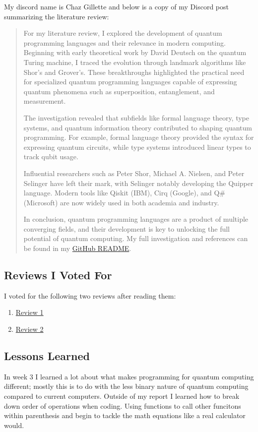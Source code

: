 \documentclass{article}
\begin{document}
My discord name is Chaz Gillette and below is a copy of my Discord post summarizing the literature review:

\begin{quote}
For my literature review, I explored the development of quantum programming languages and their relevance in modern computing. Beginning with early theoretical work by David Deutsch on the quantum Turing machine, I traced the evolution through landmark algorithms like Shor's and Grover's. These breakthroughs highlighted the practical need for specialized quantum programming languages capable of expressing quantum phenomena such as superposition, entanglement, and measurement.

The investigation revealed that subfields like formal language theory, type systems, and quantum information theory contributed to shaping quantum programming. For example, formal language theory provided the syntax for expressing quantum circuits, while type systems introduced linear types to track qubit usage.

Influential researchers such as Peter Shor, Michael A. Nielsen, and Peter Selinger have left their mark, with Selinger notably developing the Quipper language. Modern tools like Qiskit (IBM), Cirq (Google), and Q\# (Microsoft) are now widely used in both academia and industry.

In conclusion, quantum programming languages are a product of multiple converging fields, and their development is key to unlocking the full potential of quantum computing. My full investigation and references can be found in my \href{https://github.com/cgillette25/CPSC-354/blob/main/week3/README.md}{GitHub README}.
\end{quote}

\subsection*{Reviews I Voted For}
I voted for the following two reviews after reading them:

\begin{enumerate}
    \item \href{https://github.com/mdrivas/CPSC353-Assignment3/blob/main/README.md}{Review 1}
    \item \href{https://github.com/ATacoDev/LitReview354}{Review 2}
\end{enumerate}

\subsection*{Lessons Learned}
In week 3 I learned a lot about what makes programming for quantum computing different; mostly this is to do with the less binary nature of quantum computing compared to current computers. Outside of my report I learned how to break down order of operations when coding. Using functions to call other funcitons within parenthesis and begin to tackle the math equations like a real calculator would. 
\end{document}
